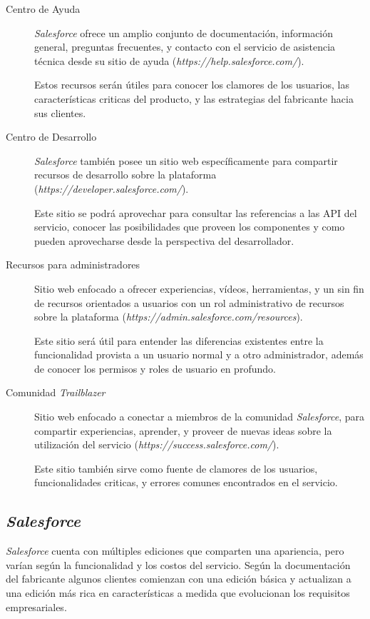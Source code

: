 \begin{description}
\item [Centro de Ayuda] \emph{Salesforce} ofrece un amplio conjunto de
documentación, información general, preguntas frecuentes, y contacto con el
servicio de asistencia técnica desde su sitio de ayuda
(\emph{https://help.salesforce.com/}).

Estos recursos serán útiles para conocer los clamores de los usuarios, las
características criticas del producto, y las estrategias del fabricante hacia
sus clientes.

\item [Centro de Desarrollo] \emph{Salesforce} también posee un sitio web
específicamente para compartir recursos de desarrollo sobre la plataforma
(\emph{https://developer.salesforce.com/}).

Este sitio se podrá aprovechar para consultar las referencias a las API del
servicio, conocer las posibilidades que proveen los componentes y como pueden
aprovecharse desde la perspectiva del desarrollador.

\item [Recursos para administradores] Sitio web enfocado a ofrecer experiencias,
vídeos, herramientas, y un sin fin de recursos orientados a usuarios con un rol
administrativo de recursos sobre la plataforma
(\emph{https://admin.salesforce.com/resources}).

Este sitio será útil para entender las diferencias existentes entre la
funcionalidad provista a un usuario normal y a otro administrador, además de
conocer los permisos y roles de usuario en profundo.

\item [Comunidad \emph{Trailblazer}] Sitio web enfocado a conectar a miembros de
la comunidad \emph{Salesforce}, para compartir experiencias, aprender, y proveer
de nuevas ideas sobre la utilización del servicio
(\emph{https://success.salesforce.com/}).

Este sitio también sirve como fuente de clamores de los usuarios,
funcionalidades criticas, y errores comunes encontrados en el servicio.

\end{description}

\subsection{\emph{Salesforce}}
\emph{Salesforce} cuenta con múltiples ediciones que comparten una apariencia,
pero varían según la funcionalidad y los costos del servicio. Según la
documentación del fabricante algunos clientes comienzan con una edición básica y
actualizan a una edición más rica en características a medida que evolucionan
los requisitos empresariales.

